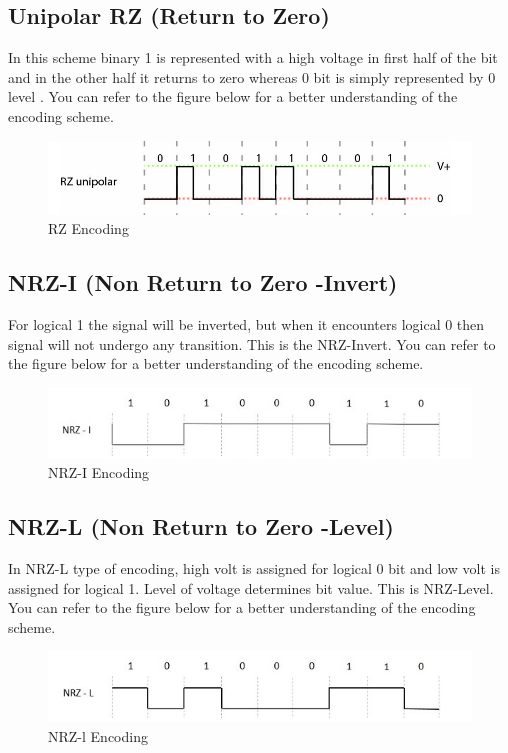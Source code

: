 \documentclass[10pt,journal,compsoc]{IEEEtran}
\begin{document}
\subsection{Unipolar RZ (Return to Zero)}
In this scheme binary 1  is represented with a high voltage in first half of the bit and in the other half it returns to zero whereas 0 bit is simply represented by 0 level . You can refer to the figure below for a better understanding of the encoding scheme.

\begin{figure}[H]
\centering
\includegraphics[scale=0.35]{encoding-rz.png}
\caption{RZ Encoding}
\end{figure}

\subsection{NRZ-I (Non Return to Zero -Invert)}
For logical 1 the signal will be inverted, but when it encounters logical 0 then signal will not undergo any transition. This is the NRZ-Invert. You can refer to the figure below for a better understanding of the encoding scheme.

\begin{figure}[H]
\centering
\includegraphics[scale=0.55]{encoding-nrzi.png}
\caption{NRZ-I Encoding}
\end{figure}


\subsection{NRZ-L (Non Return to Zero -Level)}
In NRZ-L type of encoding, high volt is assigned for logical 0 bit and low volt is assigned for logical 1. Level of voltage determines bit value. This is NRZ-Level. You can refer to the figure below for a better understanding of the encoding scheme.


\begin{figure}[H]
\centering
\includegraphics[scale=0.55]{encoding-nrzl.png}
\caption{NRZ-l Encoding}
\end{figure}
\end{document}
